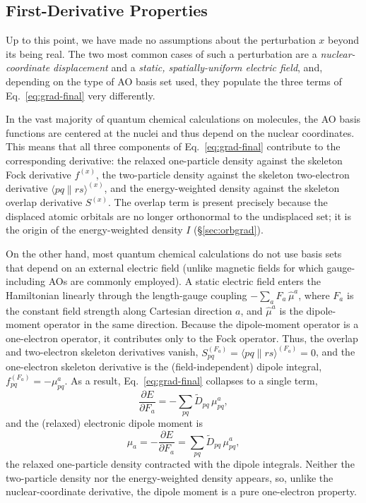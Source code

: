 \documentclass[12pt]{article}
\newcommand{\adb}[2]{\langle #1 \| #2 \rangle}
\begin{document}
\subsection{First-Derivative Properties}
\label{sec:first-deriv-props}

Up to this point, we have made no assumptions about the perturbation $x$
beyond its being real.  The two most common cases of such a perturbation are a
{\em nuclear-coordinate displacement} and a {\em static, spatially-uniform
electric field}, and, depending on the type of AO basis set used, they populate
the three terms of Eq.~\eqref{eq:grad-final} very differently.

In the vast majority of quantum chemical calculations on molecules, the AO
basis functions are centered at the nuclei and thus depend on the
nuclear coordinates. This means that all three components of
Eq.~\eqref{eq:grad-final} contribute to the corresponding derivative: the
relaxed one-particle density against the skeleton Fock derivative $f^{(x)}$,
the two-particle density against the skeleton two-electron derivative
$\adb{pq}{rs}^{(x)}$, and the energy-weighted density against the skeleton
overlap derivative $S^{(x)}$.  The overlap term is present precisely because
the displaced atomic orbitals are no longer orthonormal to the undisplaced
set; it is the origin of the energy-weighted density $I$
(\S\ref{sec:orbgrad}).

On the other hand, most quantum chemical calculations do not use basis sets
that depend on an external electric field (unlike magnetic fields for which
gauge-including AOs are commonly employed).  A static electric field enters
the Hamiltonian linearly through the length-gauge coupling $-\sum_a
F_a\,\hat\mu^a$, where $F_a$ is the constant field strength along Cartesian
direction $a$, and $\hat\mu^a$ is the dipole-moment operator in the same
direction.  Because the dipole-moment operator is a one-electron operator, it
contributes only to the Fock operator.  Thus, the overlap and two-electron
skeleton derivatives vanish, $S^{(F_a)}_{pq}=\adb{pq}{rs}^{(F_a)}=0$, and the
one-electron skeleton derivative is the (field-independent) dipole integral,
$f^{(F_a)}_{pq}=-\mu^a_{pq}$.  As a result, Eq.~\eqref{eq:grad-final}
collapses to a single term,
\begin{equation}
\frac{\partial E}{\partial F_a} = -\sum_{pq}\tilde D_{pq}\,\mu^a_{pq},
\end{equation}
and the (relaxed) electronic dipole moment is
\begin{equation}
\mu_a = -\frac{\partial E}{\partial F_a} = \sum_{pq}\tilde D_{pq}\,\mu^a_{pq},
\label{eq:dipole}
\end{equation}
the relaxed one-particle density contracted with the dipole integrals.
Neither the two-particle density nor the energy-weighted density appears, so,
unlike the nuclear-coordinate derivative, the dipole moment is a pure
one-electron property.  
\end{document}
